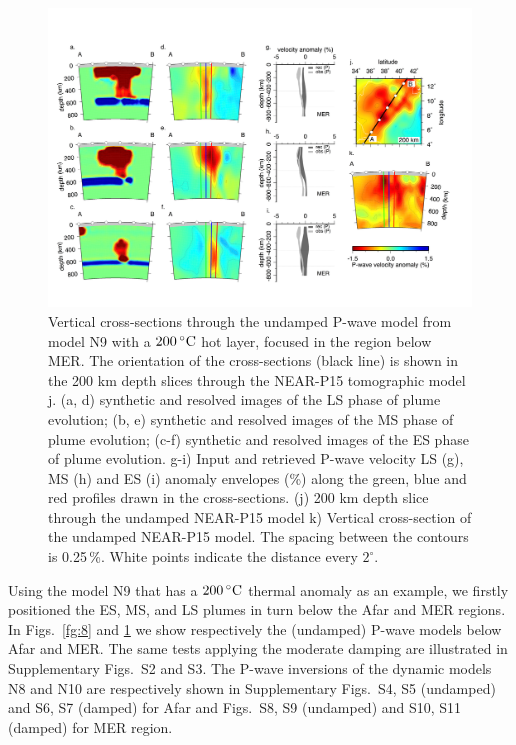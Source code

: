 \documentclass[a4paper,10pt,twocolumn]{paper}
\begin{document}
\begin{figure}
\centering
\includegraphics[width=16cm]{../figures-working/fig10.png}
\caption{Vertical cross-sections through the undamped P-wave model from model N9 with a $200\rm\,^{\circ}C$ hot layer, focused in the region below MER.  The orientation of the cross-sections (black line) is shown in the 200 km depth slices through the NEAR-P15 tomographic model  j.  (a, d) synthetic and resolved images of the LS phase of plume evolution; (b, e) synthetic and resolved images of the MS phase of plume evolution; (c-f) synthetic and resolved images of the ES phase of plume evolution. g-i) Input and retrieved P-wave velocity LS (g), MS (h) and ES (i) anomaly envelopes (\%) along the green, blue and red profiles drawn in the cross-sections. (j) 200 km depth slice through the undamped NEAR-P15 model k) Vertical cross-section of the undamped NEAR-P15 model. The spacing between the contours is 0.25\,\%. White points indicate the distance every $2^{\circ}$.}
\label{fg:9}
\end{figure}

Using the model N9 that has a $200\rm\,^{\circ}C$ thermal anomaly as an example, we firstly positioned the ES, MS, and LS plumes in turn below the Afar and MER regions. In Figs.~\ref{fg:8} and \ref{fg:9} we show respectively the (undamped) P-wave models below Afar and MER. The same tests applying the moderate damping are illustrated in Supplementary Figs.~S2 and S3. The P-wave inversions of the dynamic models N8 and N10 are respectively shown in Supplementary Figs.~S4, S5 (undamped) and S6, S7 (damped) for Afar and Figs.~S8, S9 (undamped) and S10, S11 (damped) for MER region.
\end{document}
